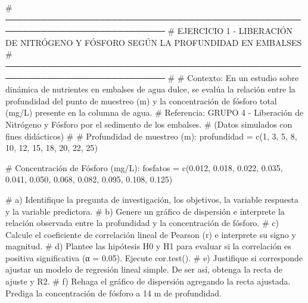 \documentclass[
  spanish,
  letterpaper,
  DIV=11,
  numbers=noendperiod]{scrreprt}
\newenvironment{Shaded}{\begin{snugshade}}{\end{snugshade}}
\newcommand{\CommentTok}[1]{\textcolor[rgb]{0.37,0.37,0.37}{#1}}
\newcommand{\DecValTok}[1]{\textcolor[rgb]{0.68,0.00,0.00}{#1}}
\newcommand{\FloatTok}[1]{\textcolor[rgb]{0.68,0.00,0.00}{#1}}
\newcommand{\FunctionTok}[1]{\textcolor[rgb]{0.28,0.35,0.67}{#1}}
\newcommand{\NormalTok}[1]{\textcolor[rgb]{0.00,0.23,0.31}{#1}}
\newcommand{\OtherTok}[1]{\textcolor[rgb]{0.00,0.23,0.31}{#1}}
\begin{document}
\begin{Shaded}
\begin{Highlighting}[]

\CommentTok{\# ─────────────────────────────────────────────────────────────────────────────}
\CommentTok{\# EJERCICIO 1 {-} LIBERACIÓN DE NITRÓGENO Y FÓSFORO SEGÚN LA PROFUNDIDAD EN EMBALSES}
\CommentTok{\# ─────────────────────────────────────────────────────────────────────────────}
\CommentTok{\#}
\CommentTok{\# Contexto: En un estudio sobre dinámica de nutrientes en embalses de agua dulce, se evalúa la relación entre la profundidad del punto de muestreo (m) y la concentración de fósforo total (mg/L) presente en la columna de agua.}
\CommentTok{\# Referencia: GRUPO 4 {-} Liberación de Nitrógeno y Fósforo por el sedimento de los embalses.}
\CommentTok{\# (Datos simulados con fines didácticos)}
\CommentTok{\#}
\CommentTok{\# Profundidad de muestreo (m):}
\NormalTok{profundidad }\OtherTok{=} \FunctionTok{c}\NormalTok{(}\DecValTok{1}\NormalTok{, }\DecValTok{3}\NormalTok{, }\DecValTok{5}\NormalTok{, }\DecValTok{8}\NormalTok{, }\DecValTok{10}\NormalTok{, }\DecValTok{12}\NormalTok{, }\DecValTok{15}\NormalTok{, }\DecValTok{18}\NormalTok{, }\DecValTok{20}\NormalTok{, }\DecValTok{22}\NormalTok{, }\DecValTok{25}\NormalTok{)}

\CommentTok{\# Concentración de Fósforo (mg/L):}
\NormalTok{fosfatos }\OtherTok{=} \FunctionTok{c}\NormalTok{(}\FloatTok{0.012}\NormalTok{, }\FloatTok{0.018}\NormalTok{, }\FloatTok{0.022}\NormalTok{, }\FloatTok{0.035}\NormalTok{, }\FloatTok{0.041}\NormalTok{, }\FloatTok{0.050}\NormalTok{, }\FloatTok{0.068}\NormalTok{, }\FloatTok{0.082}\NormalTok{, }\FloatTok{0.095}\NormalTok{, }\FloatTok{0.108}\NormalTok{, }\FloatTok{0.125}\NormalTok{)}

\CommentTok{\# a) Identifique la pregunta de investigación, los objetivos, la variable respuesta y la variable predictora.}
\CommentTok{\# b) Genere un gráfico de dispersión e interprete la relación observada entre la profundidad y la concentración de fósforo.}
\CommentTok{\# c) Calcule el coeficiente de correlación lineal de Pearson (r) e interprete su signo y magnitud.}
\CommentTok{\# d) Plantee las hipótesis H0 y H1 para evaluar si la correlación es positiva significativa (α = 0.05). Ejecute cor.test().}
\CommentTok{\# e) Justifique si corresponde ajustar un modelo de regresión lineal simple. De ser así, obtenga la recta de ajuste y R2.}
\CommentTok{\# f) Rehaga el gráfico de dispersión agregando la recta ajustada. Prediga la concentración de fósforo a 14 m de profundidad.}


\end{Highlighting}
\end{Shaded}
\end{document}
